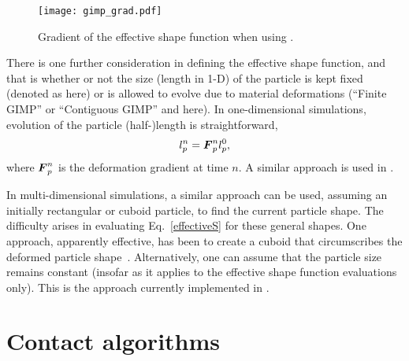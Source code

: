 \begin{figure}
  \centering
  \texttt{[image: gimp\_grad.pdf]}
  \caption{Gradient of the effective shape function when using \GIMP.}
  \label{Fig:GradGIMP}
\end{figure}
%
\begin{NoteBox}
There is one further consideration in defining the effective shape function,
and that is whether or not the size (length in 1-D) of the particle is kept
fixed (denoted as  here)
or is allowed to evolve due to material deformations 
(``Finite GIMP'' or ``Contiguous GIMP'' and  here).
In one-dimensional
simulations, evolution of the particle (half-)length is straightforward,
\begin{equation} \label{particle_length}
l_p^n = \boldsymbol{F}_p^n l_p^0 , 
\end{equation} 
where $\boldsymbol{F}_p^n$ is the deformation gradient at time $n$. A similar approach is used
in .
\end{NoteBox}

In multi-dimensional simulations, a similar approach can be used, assuming
an initially rectangular or cuboid particle, to find the current particle
shape.  The difficulty arises in evaluating Eq.~\eqref{effectiveS} for
these general shapes.  One approach, apparently effective, has been to create
a cuboid that circumscribes the deformed particle shape~\cite{jinmaCMES2006}.
Alternatively, one can assume that the particle size remains constant (insofar
as it applies to the effective shape function evaluations only).  This is
the approach currently implemented in \Vaango.

\section{Contact algorithms}


